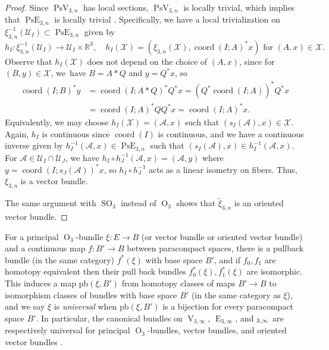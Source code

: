\documentclass[11pt]{article}
\numberwithin{equation}{section}
\theoremstyle{remark}
\let\mc\mathcal
\let\mb\mathbb
\let\df\emph
\DeclareMathOperator{\pe}{PsE}
\DeclareMathOperator{\e}{E}
\let\oe\relax
\DeclareMathOperator{\oe}{\widetilde E}
\DeclareMathOperator{\orth}{O}
\DeclareMathOperator{\sorth}{SO}
\DeclareMathOperator{\stief}{V}
\DeclareMathOperator{\pstief}{PsV}
\DeclareMathOperator{\coord}{coord}
\begin{document}
\begin{proof}
Since $\pstief_{3,n}$ has local sections, $\pstief_{3,n}$ is locally trivial, which implies that $\pe_{3,n}$ is locally trivial \cite[\S 4.7]{husemoller1994fibre}.
Specifically, we have a local trivialization on $\xi_{3,n}^{-1}(\mc{U}_I) \subset \pe_{3,n}$ given by
\[ h_I : \xi_{3,n}^{-1}(\mc{U}_I) \to \mc{U}_I \times \mb{R}^3, \quad h_I(\mc{X}) = (\xi_{3,n}(\mc{X}),\coord(I;A)^*x) \text{ for } (A,x) \in \mc{X}. \]
Observe that $h_I(\mc{X})$ does not depend on the choice of $(A,x)$, since for $(B,y) \in \mc{X}$, we~have $B = A*Q$ and $y = Q^* x$, so
\begin{align*}
\coord(I;B)^*y &= \coord(I;A*Q)^*Q^*x = (Q^*\coord(I;A))^*Q^*x\\
&= \coord(I;A)^*QQ^*x = \coord(I;A)^*x.
\end{align*}
Equivalently, we may choose $h_I(\mc{X})=(\mc{A},x)$ such that $(s_I(\mc{A}),x) \in \mc{X}$. Again, $h_I$ is continuous since $\coord(I)$ is continuous, and we have a continuous inverse given by
$h_I^{-1}(\mc{A},x) \in \pe_{3,n}$ such that $(s_I(\mc{A}),x) \in h_I^{-1}(\mc{A},x)$.
For $\mc{A} \in \mc{U}_I \cap \mc{U}_J$, we have $h_I \circ h_J^{-1}(\mc{A},x) = (\mc{A},y)$ where $y = \coord(I;s_J(\mc{A}))^*x$, so $h_I \circ h_J^{-1}$ acts as a linear isometry on fibers.
Thus, $\xi_{3,n}$ is a vector bundle.

The same argument with $\sorth_3$ instead of $\orth_3$ shows that $\widetilde\xi_{3,n}$ is an oriented vector bundle.
\end{proof}

For a principal $\orth_3$-bundle $\xi: E \to B$ (or vector bundle or oriented vector bundle) and a continuous map $f: B' \to B$ between paracompact spaces, there is a pullback bundle (in the same category) $f^*(\xi)$ with base space $B'$, and if $f_0,f_1$ are homotopy equivalent then their pull back bundles $f_0^*(\xi),f_1^*(\xi)$ are isomorphic.
This induces a map $\text{pb}(\xi,B')$ from homotopy classes of maps $B' \to B$ to isomorphism classes of bundles with base space $B'$ (in the same category as $\xi$), and we say $\xi$ is \df{universal} when $\text{pb}(\xi,B')$ is a bijection for every paracompact space $B'$.
In particular, the canonical bundles on $\stief_{3,\infty}$, $\e_{3,\infty}$, and $\oe_{3,\infty}$ are respectively universal for principal $\orth_3$-bundles, vector bundles, and oriented vector bundles \cite{husemoller1994fibre}.
\end{document}
